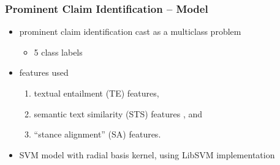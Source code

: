 \documentclass{beamer}
\begin{document}
\begin{frame}
	\frametitle{Prominent Claim Identification -- Model}

\begin{itemize}
	\item prominent claim identification cast as a multiclass problem
	\begin{itemize}
		\item 5 class labels
	\end{itemize}
\item features used
	\begin{enumerate}
	\item textual entailment (TE) features, 
	\item semantic text similarity (STS) features \cite{vsaric2012takelab}, and
	\item ``stance alignment'' (SA) features. 
	\end{enumerate}
\item SVM model with radial basis kernel, using LibSVM implementation \cite{chang2011libsvm}
\end{itemize}
\end{frame}
\end{document}

